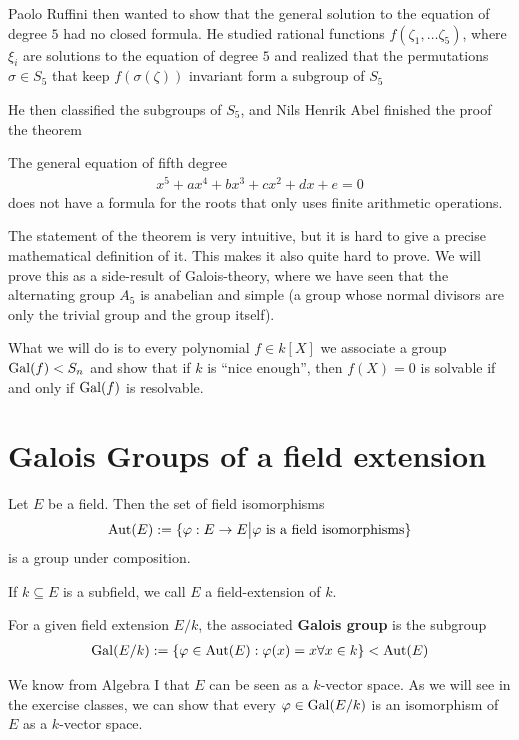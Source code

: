 Paolo Ruffini then wanted to show that the general solution to the equation of degree $5$ had no closed formula.
He studied rational functions $f(\zeta_1, \ldots \zeta_5)$, where $\xi_i$ are solutions to the equation of degree $5$ and realized that the permutations $\sigma \in S_5$ that keep $f(\sigma(\zeta))$ invariant form a subgroup of $S_5$

He then classified the subgroups of $S_5$, and Nils Henrik Abel finished the proof the theorem
\begin{thm}
  The general equation of fifth degree 
  \begin{align*}
    x^{5} + ax^{4} + bx^{3} + cx^{2} + dx + e = 0
  \end{align*}
  does not have a formula for the roots that only uses finite arithmetic operations.
\end{thm}
The statement of the theorem is very intuitive, but it is hard to give a precise mathematical definition of it. This makes it also quite hard to prove.
We will prove this as a side-result of Galois-theory, where we have seen that the alternating group $A_5$ is anabelian and simple (a group whose normal divisors are only the trivial group and the group itself).

What we will do is to every polynomial $f \in k[X]$ we associate a group $\operatorname{Gal}(f) < S_n$ and show that if $k$ is ``nice enough'', then $f(X) = 0$ is solvable if and only if $\operatorname{Gal}(f)$ is resolvable.



\section{Galois Groups of a field extension}

Let $E$ be a field. Then the set of field isomorphisms
\begin{align*}
  \operatorname{Aut}(E) := \{\varphi: E \to  E \big\vert \varphi \text{ is a field isomorphisms}\}  
\end{align*}
is a group under composition.

If $k \subseteq E$ is a subfield, we call $E$ a field-extension of $k$.

\begin{dfn}[]
  For a given field extension $E/k$, the associated \textbf{Galois group} is the subgroup
  \begin{align*}
    \operatorname{Gal}(E/k) := \{\varphi \in \operatorname{Aut}(E): \varphi(x) = x \forall x \in k\} < \operatorname{Aut}(E)
  \end{align*}
\end{dfn}
We know from Algebra I that $E$ can be seen as a $k$-vector space. As we will see in the exercise classes, we can show that every $\varphi \in \operatorname{Gal}(E/k)$ is an isomorphism of $E$ as a $k$-vector space.

